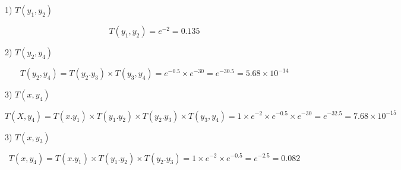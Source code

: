 \documentclass[11pt,addpoints,answers]{exam}
\begin{document}
\begin{questions}
\begin{tcolorbox}[fit,height=20cm, width=\textwidth, blank, borderline={0.5pt}{-2pt},halign=left, valign=center, nobeforeafter]
\begin{studentsolution}
1) $T(y_1, y_2)$

\begin{equation}
    T (y_1, y_2) = e^{-2} = 0.135
\end{equation}

2) $T(y_2, y_4)$

\begin{equation}
    T (y_2, y_4) = T(y_2. y_3) \times T (y_3, y_4) = e^{-0.5} \times e^{-30} = e^{-30.5} = 5.68 \times 10^{-14}
\end{equation}

3) $T(x, y_4)$

\begin{equation}
    T (X, y_4) = T(x. y_1) \times T(y_1. y_2) \times T(y_2. y_3) \times T (y_3, y_4) = 1 \times e^{-2} \times e^{-0.5} \times e^{-30} = e^{-32.5} = 7.68 \times 10^{-15}
\end{equation}

3) $T(x, y_3)$

\begin{equation}
    T (x, y_4) = T(x. y_1) \times T(y_1. y_2) \times T(y_2. y_3) = 1 \times e^{-2} \times e^{-0.5} = e^{-2.5} = 0.082
\end{equation}



\end{studentsolution}

\end{tcolorbox}
\end{questions}
\end{document}
